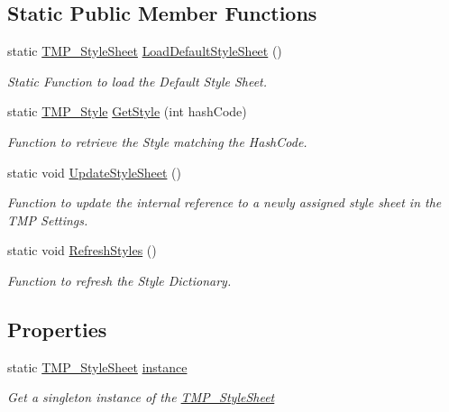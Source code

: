 \subsection*{Static Public Member Functions}
\begin{DoxyCompactItemize}
\item 
static \mbox{\hyperlink{class_t_m_pro_1_1_t_m_p___style_sheet}{T\+M\+P\+\_\+\+Style\+Sheet}} \mbox{\hyperlink{class_t_m_pro_1_1_t_m_p___style_sheet_a653c12d4d1759a054f7f37a2d0b33924}{Load\+Default\+Style\+Sheet}} ()
\begin{DoxyCompactList}\small\item\em Static Function to load the Default Style Sheet. \end{DoxyCompactList}\item 
static \mbox{\hyperlink{class_t_m_pro_1_1_t_m_p___style}{T\+M\+P\+\_\+\+Style}} \mbox{\hyperlink{class_t_m_pro_1_1_t_m_p___style_sheet_a238d4f39d98e02352e4a9633ba08d126}{Get\+Style}} (int hash\+Code)
\begin{DoxyCompactList}\small\item\em Function to retrieve the Style matching the Hash\+Code. \end{DoxyCompactList}\item 
static void \mbox{\hyperlink{class_t_m_pro_1_1_t_m_p___style_sheet_a4bab3ca47934d537b41ae066eabac404}{Update\+Style\+Sheet}} ()
\begin{DoxyCompactList}\small\item\em Function to update the internal reference to a newly assigned style sheet in the T\+MP Settings. \end{DoxyCompactList}\item 
static void \mbox{\hyperlink{class_t_m_pro_1_1_t_m_p___style_sheet_aa7ee1ff983631f35b479fbda8df90829}{Refresh\+Styles}} ()
\begin{DoxyCompactList}\small\item\em Function to refresh the Style Dictionary. \end{DoxyCompactList}\end{DoxyCompactItemize}
\subsection*{Properties}
\begin{DoxyCompactItemize}
\item 
static \mbox{\hyperlink{class_t_m_pro_1_1_t_m_p___style_sheet}{T\+M\+P\+\_\+\+Style\+Sheet}} \mbox{\hyperlink{class_t_m_pro_1_1_t_m_p___style_sheet_aa857b610ca839ac49f96ac6bc66ac201}{instance}}
\begin{DoxyCompactList}\small\item\em Get a singleton instance of the \mbox{\hyperlink{class_t_m_pro_1_1_t_m_p___style_sheet}{T\+M\+P\+\_\+\+Style\+Sheet}} \end{DoxyCompactList}\end{DoxyCompactItemize}


